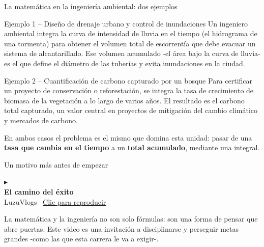 \documentclass[aspectratio=169,11pt]{beamer}
\begin{document}
\begin{frame}{La matemática en la ingeniería ambiental: dos ejemplos}
\small
\begin{block}{Ejemplo 1 -- Diseño de drenaje urbano y control de inundaciones}
Un ingeniero ambiental integra la curva de intensidad de lluvia en el tiempo (el hidrograma de una tormenta) para obtener el volumen total de escorrentía que debe evacuar un sistema de alcantarillado. Ese volumen acumulado -el área bajo la curva de lluvia- es el que define el diámetro de las tuberías y evita inundaciones en la ciudad.
\end{block}
\vspace{0.15cm}
\begin{block}{Ejemplo 2 -- Cuantificación de carbono capturado por un bosque}
Para certificar un proyecto de conservación o reforestación, se integra la tasa de crecimiento de biomasa de la vegetación a lo largo de varios años. El resultado es el carbono total capturado, un valor central en proyectos de mitigación del cambio climático y mercados de carbono.
\end{block}
\vspace{0.1cm}
\begin{keybox}[top=2pt,bottom=2pt]
En ambos casos el problema es el mismo que domina esta unidad: pasar de una \textbf{tasa que cambia en el tiempo} a un \textbf{total acumulado}, mediante una integral.
\end{keybox}
\end{frame}

\begin{frame}{Un motivo más antes de empezar}
\centering
\begin{tcolorbox}[colback=azul,colframe=azulOsc,arc=4pt,boxrule=1pt,
  width=9.3cm,height=2.7cm,valign=center,halign=center]
  {\color{white}\large$\blacktriangleright$}\\[2pt]
  {\color{white}\large\bfseries El camino del éxito}\\[1pt]
  {\color{azulClaro}\footnotesize LuzuVlogs \textbullet\ \href{run:recursos/video_motivacional_camino_del_exito.mp4}{\underline{Clic para reproducir}}}
\end{tcolorbox}
\vspace{0.15cm}
\begin{keybox}[top=3pt,bottom=3pt]
\small La matemática y la ingeniería no son solo fórmulas: son una forma de pensar que abre puertas. Este video es una invitación a disciplinarse y perseguir metas grandes -como las que esta carrera le va a exigir-.
\end{keybox}
\end{frame}
\end{document}
